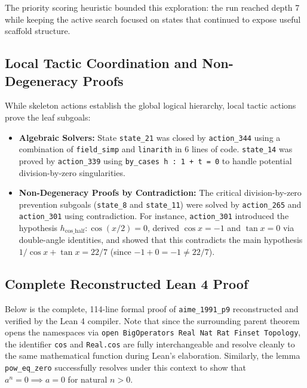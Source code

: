 The priority scoring heuristic bounded this exploration: the run reached depth 7 while keeping the
active search focused on states that continued to expose useful scaffold structure.

\subsection{Local Tactic Coordination and Non-Degeneracy Proofs}

While skeleton actions establish the global logical hierarchy, local tactic actions prove the leaf subgoals:
\begin{itemize}
    \item \textbf{Algebraic Solvers:} State \texttt{state\_21} was closed by \texttt{action\_344} using a combination of \texttt{field\_simp} and \texttt{linarith} in 6 lines of code. \texttt{state\_14} was proved by \texttt{action\_339} using \texttt{by\_cases h : 1 + t = 0} to handle potential division-by-zero singularities.
    \item \textbf{Non-Degeneracy Proofs by Contradiction:} The critical division-by-zero prevention subgoals (\texttt{state\_8} and \texttt{state\_11}) were solved by \texttt{action\_265} and \texttt{action\_301} using contradiction. For instance, \texttt{action\_301} introduced the hypothesis $h_{\mathrm{cos\_half}} : \cos(x/2) = 0$, derived $\cos x = -1$ and $\tan x = 0$ via double-angle identities, and showed that this contradicts the main hypothesis $1/\cos x + \tan x = 22/7$ (since $-1 + 0 = -1 \neq 22/7$).
\end{itemize}

\subsection{Complete Reconstructed Lean 4 Proof}

Below is the complete, 114-line formal proof of \texttt{aime\_1991\_p9} reconstructed and verified by the Lean 4 compiler. Note that since the surrounding parent theorem opens the namespaces via \texttt{open BigOperators Real Nat Rat Finset Topology}, the identifier \texttt{cos} and \texttt{Real.cos} are fully interchangeable and resolve cleanly to the same mathematical function during Lean's elaboration. Similarly, the lemma \texttt{pow\_eq\_zero} successfully resolves under this context to show that $a^n = 0 \implies a = 0$ for natural $n > 0$.

